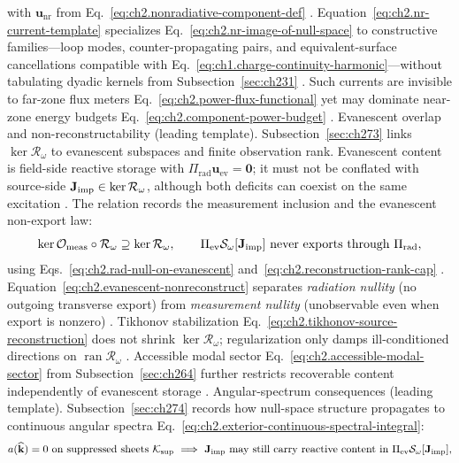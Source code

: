 with \(\mathbf{u}_{\mathrm{nr}}\) from Eq.~\eqref{eq:ch2.nonradiative-component-def}
\cite{stratton1941}. Equation~\eqref{eq:ch2.nr-current-template}
specializes Eq.~\eqref{eq:ch2.nr-image-of-null-space} to constructive families---loop modes,
counter-propagating pairs, and equivalent-surface cancellations compatible with
Eq.~\eqref{eq:ch1.charge-continuity-harmonic}---without tabulating dyadic kernels from
Subsection~\ref{sec:ch231} \cite{stratton1941}. Such currents are invisible to far-zone flux
meters Eq.~\eqref{eq:ch2.power-flux-functional} yet may dominate near-zone energy budgets
Eq.~\eqref{eq:ch2.component-power-budget} \cite{harrington2001}.
Evanescent overlap and non-reconstructability (leading template). Subsection~\ref{sec:ch273} links \(\ker\mathcal{R}_\omega\) to evanescent subspaces and
finite observation rank. Evanescent content is field-side reactive storage with
\(\Pi_{\mathrm{rad}}\mathbf{u}_{\mathrm{ev}}=\mathbf{0}\); it must not be conflated with
source-side \(\mathbf{J}_{\mathrm{imp}}\in\ker\mathcal{R}_\omega\), although both deficits can coexist on the same
excitation \cite{stratton1941}. The relation records the measurement inclusion and
the evanescent non-export law:
\begin{equation}
\label{eq:ch2.evanescent-nonreconstruct}
\ker\mathcal{O}_{\mathrm{meas}}\circ\mathcal{R}_\omega
\supseteq
\ker\mathcal{R}_\omega,
\qquad
\Pi_{\mathrm{ev}}\mathcal{S}_\omega[\mathbf{J}_{\mathrm{imp}}]
\ \text{never exports through}\ \Pi_{\mathrm{rad}},
\end{equation}
using Eqs.~\eqref{eq:ch2.rad-null-on-evanescent} and~\eqref{eq:ch2.reconstruction-rank-cap}
\cite{stratton1941}. Equation~\eqref{eq:ch2.evanescent-nonreconstruct}
separates \emph{radiation nullity} (no outgoing transverse export) from \emph{measurement
nullity} (unobservable even when export is nonzero) \cite{stratton1941}. Tikhonov stabilization
Eq.~\eqref{eq:ch2.tikhonov-source-reconstruction} does not shrink \(\ker\mathcal{R}_\omega\);
regularization only damps ill-conditioned directions on \(\operatorname{ran}\mathcal{R}_\omega\)
\cite{harrington2001}. Accessible modal sector
Eq.~\eqref{eq:ch2.accessible-modal-sector} from Subsection~\ref{sec:ch264} further restricts
recoverable content independently of evanescent storage \cite{stratton1941}.
Angular-spectrum consequences (leading template). Subsection~\ref{sec:ch274} records how null-space structure propagates to continuous angular
spectra Eq.~\eqref{eq:ch2.exterior-continuous-spectral-integral}:
\begin{equation}
\label{eq:ch2.angular-spectrum-null}
a(\widehat{\mathbf{k}})=0
\ \text{on suppressed sheets}\ \mathcal{K}_{\mathrm{sup}}
\ \Longrightarrow\
\Jimp\ \text{may still carry reactive content in}\ \Pi_{\mathrm{ev}}\mathcal{S}_\omega[\Jimp],
\end{equation}
